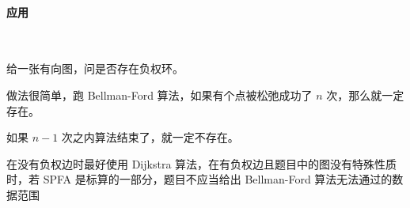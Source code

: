 \paragraph{应用}~{}
\par
给一张有向图，问是否存在负权环。\par
做法很简单，跑 Bellman-Ford 算法，如果有个点被松弛成功了 $n$ 次，那么就一定存在。\par
如果 $n-1$ 次之内算法结束了，就一定不存在。\par
在没有负权边时最好使用 Dijkstra 算法，在有负权边且题目中的图没有特殊性质时，若 SPFA 是标算的一部分，题目不应当给出 Bellman-Ford 算法无法通过的数据范围\par

